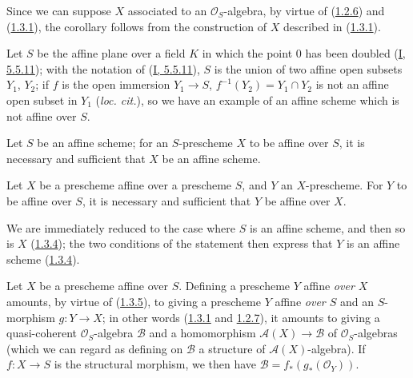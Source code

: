 Since we can suppose $X$ associated to an $\mathcal{O}_S$-algebra, by virtue
of (\hyperref[II.1.2.6]{1.2.6}) and (\hyperref[II.1.3.1]{1.3.1}), the
corollary follows from the construction of $X$ described in
(\hyperref[II.1.3.1]{1.3.1}).

\begin{example}[1.3.3]
\label{II.1.3.3}
Let $S$ be the affine plane over a field $K$ in which the point $0$ has been
doubled (\hyperref[I.5.5.11]{I, 5.5.11}); with the notation of
(\hyperref[I.5.5.11]{I, 5.5.11}), $S$ is the union of two affine open
subsets $Y_1$, $Y_2$; if $f$ is the open immersion $Y_1\to S$,
$f^{-1}(Y_2)=Y_1\cap Y_2$ is not an affine open subset in $Y_1$
(\emph{loc. cit.}), so we have an example of an affine scheme which is not
affine over $S$.
\end{example}

\begin{corollary}[1.3.4]
\label{II.1.3.4}
Let $S$ be an affine scheme; for an $S$-prescheme $X$ to be affine over
$S$, it is necessary and sufficient that $X$ be an affine scheme.
\end{corollary}

\begin{corollary}[1.3.5]
\label{II.1.3.5}
Let $X$ be a prescheme affine over a prescheme $S$, and $Y$ an
$X$-prescheme. For $Y$ to be affine over $S$, it is necessary and
sufficient that $Y$ be affine over $X$.
\end{corollary}

We are immediately reduced to the case where $S$ is an affine scheme, and
then so is $X$ (\hyperref[II.1.3.4]{1.3.4}); the two conditions of
the statement then express that $Y$ is an affine scheme
(\hyperref[II.1.3.4]{1.3.4}).

\begin{env}[1.3.6]
\label{II.1.3.6}
Let $X$ be a prescheme affine over $S$. Defining a prescheme $Y$
affine \emph{over $X$} amounts, by virtue of
(\hyperref[II.1.3.5]{1.3.5}), to giving a prescheme $Y$ affine
\emph{over $S$} and an $S$-morphism $g:Y\to X$; in other words
(\hyperref[II.1.3.1]{1.3.1} and
\hyperref[II.1.2.7]{1.2.7}), it amounts to giving a quasi-coherent
$\mathcal{O}_S$-algebra $\mathcal{B}$ and a homomorphism
$\mathcal{A}(X)\to\mathcal{B}$ of $\mathcal{O}_S$-algebras (which we can
regard as defining on $\mathcal{B}$ a structure of
$\mathcal{A}(X)$-algebra). If $f:X\to S$ is the structural morphism, we then
have $\mathcal{B}=f_*(g_*(\mathcal{O}_Y))$.
\end{env}

